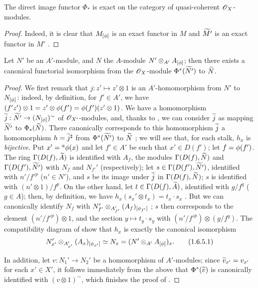 \begin{cor}[1.6.4]
\label{1.1.6.4}
The direct image functor $\Phi_*$ is exact on the category of quasi-coherent $\mathscr{O}_X$-modules.
\end{cor}

\begin{proof}
\label{proof-1.1.6.4}
Indeed, it is clear that $M_{[\phi]}$ is an exact functor in $M$ and ${\widetilde{M'}}$ is an
exact functor in $M'$ .
\end{proof}

\begin{prop}[1.6.5]
\label{1.1.6.5}
Let $N'$ be an $A'$-module, and $N$ the $A$-module $N'\otimes_{A'}A_{[\phi]}$;
then there exists a canonical functorial isomorphism from the $\mathscr{O}_X$-module $\Phi^*({\widetilde{N'}})$ to ${\widetilde{N}}$.
\end{prop}

\begin{proof}
\label{proof-1.1.6.5}
We first remark that $j:z'\mapsto z'\otimes 1$ is an $A'$-homomorphism from $N'$ to $N_{[\phi]}$: indeed, by definition, for $f'\in A'$, we have $(f' z')\otimes 1=z'\otimes\phi(f')=\phi(f')(z'\otimes 1)$.
We have  a homomorphism $\wt{j}:\wt{N'}\to(N_{[\vphi]})^\sim$ of $\mathscr{O}_{X'}$-modules, and, thanks to , we can consider ${\widetilde{j}}$ as mapping ${\widetilde{N'}}$ to $\Phi_*({\widetilde{N}})$.
There canonically corresponds to this homomorphism ${\widetilde{j}}$ a homomorphism $h={\widetilde{j}}^\sharp$ from $\Phi^*({\widetilde{N'}})$ to ${\widetilde{N}}$ ;
we will see that, for each stalk, $h_x$ is \emph{bijective}.
Put $x'={}^a\phi(x)$ and let $f'\in A'$ be such that $x'\in D(f')$;
let $f=\phi(f')$.
The ring $\Gamma(D(f),{\widetilde{A}})$ is identified with $A_f$, the modules
$\Gamma(D(f),{\widetilde{N}})$ and $\Gamma(D(f'),{\widetilde{N'}})$ with $N_f$ and $N_{f'}'$
(respectively);
let $s\in\Gamma(D(f'),{\widetilde{N'}})$, identified with $n'/{f'}^p$ ($n'\in N'$), and $s$ be its image under ${\widetilde{j}}$ in $\Gamma(D(f),{\widetilde{N}})$;
$s$ is identified with $(n'\otimes 1)/f^p$.
On the other hand, let $t\in\Gamma(D(f),{\widetilde{A}})$, identified with $g/f^q$ ($g\in A$);
then, by definition, we have $h_x(s_x'\otimes t_x)=t_x\cdot s_x$ .
But we can canonically identify $N_f$ with $N_{f'}'\otimes_{A_{f'}'}(A_f)_{[\phi_{f'}]}$ ;
$s$ then corresponds to the element $(n'/{f'}^p)\otimes 1$, and the section $y\mapsto t_y\cdot s_y$ with $(n'/{f'}^p)\otimes(g/f^q)$.
The compatibility diagram of  show that $h_x$ is exactly the canonical isomorphism
\begin{equation*}
  \label{1.1.6.5.1}
  N_{x'}'\otimes_{A_{x'}'}(A_x)_{[\phi_{x'}]}\simeq N_x=(N'\otimes_{A'}A_{[\phi]})_x.
  \tag{1.6.5.1}
\end{equation*}

In addition, let $v:N_1'\to N_2'$ be a homomorphism of $A'$-modules;
since ${\widetilde{v}}_{x'}=v_{x'}$ for each $x'\in X'$, it follows immediately from the above that $\Phi^*({\widetilde{v}})$ is canonically identified with $(v\otimes 1)^\sim$, which finishes the proof of .
\end{proof}

